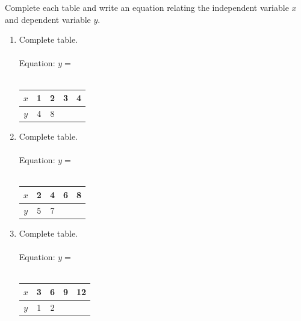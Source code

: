 \documentclass[12pt, letterpaper, fleqn]{article}
\newcommand{\blanklong}{\underline{\hspace{6.5cm}}}
\newcommand{\blankshorter}{\underline{\hspace{1.5cm}}}
\begin{document}
\noindent
Complete each table and write an equation relating the independent variable $x$ and dependent variable $y$.

\vspace{3mm}

\begin{enumerate}[itemsep=2.2cm, leftmargin=0.6cm]

\item Complete table. \\ \\ Equation: $y = $ \blanklong \\ \\
\begin{tabular}{|c|c|c|c|c|}
\hline
$x$ & 1 & 2 & 3 & 4 \\ \hline
$y$ & 4 & 8 & \blankshorter & \blankshorter \\ \hline
\end{tabular}

\vspace{0.8cm}

\item Complete table. \\ \\ Equation: $y = $ \blanklong \\ \\
\begin{tabular}{|c|c|c|c|c|}
\hline
$x$ & 2 & 4 & 6 & 8 \\ \hline
$y$ & 5 & 7 & \blankshorter & \blankshorter \\ \hline
\end{tabular}

\vspace{0.8cm}

\item Complete table. \\ \\ Equation: $y = $ \blanklong \\ \\
\begin{tabular}{|c|c|c|c|c|}
\hline
$x$ & 3 & 6 & 9 & 12 \\ \hline
$y$ & 1 & 2 & \blankshorter & \blankshorter \\ \hline
\end{tabular}

\vspace{0.8cm}

\end{enumerate}

\newpage
\end{document}
